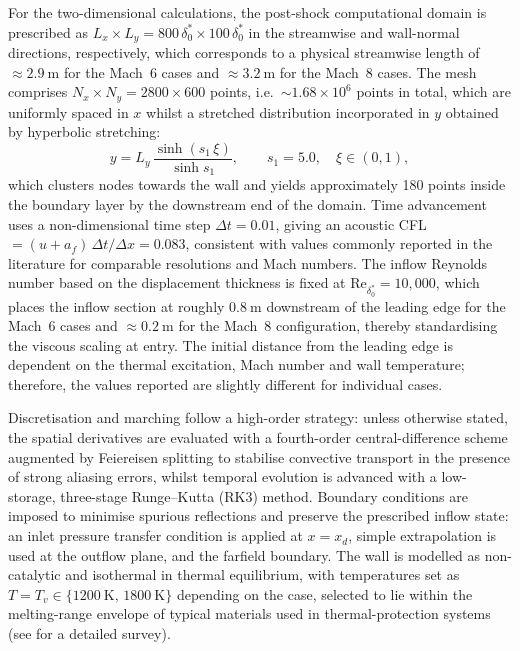 For the two-dimensional calculations, the post-shock computational domain is prescribed as $L_x\times L_y=800\,\delta^{*}_{0}\times 100\,\delta^{*}_{0}$ in the streamwise and wall-normal directions, respectively, which corresponds to a physical streamwise length of $\approx 2.9~\mathrm{m}$ for the Mach~6 cases and $\approx 3.2~\mathrm{m}$ for the Mach~8 cases. The mesh comprises $N_x\times N_y=2800\times 600$ points, i.e.\ $\sim 1.68\times 10^{6}$ points in total, which are uniformly spaced in $x$ whilst a stretched distribution incorporated in $y$ obtained by hyperbolic stretching:
\begin{equation}
y=L_y\,\frac{\sinh\!\left(s_1\,\xi\right)}{\sinh s_1},\qquad s_1=5.0,\quad \xi\in(0,1),
\end{equation}
which clusters nodes towards the wall and yields approximately 180 points inside the boundary layer by the downstream end of the domain. Time advancement uses a non-dimensional time step $\Delta t=0.01$, giving an acoustic \gls{CFL}$=(u+a_f)\,\Delta t/\Delta x=0.083$, consistent with values commonly reported in the literature for comparable resolutions and Mach numbers. The inflow Reynolds number based on the displacement thickness is fixed at $\mathrm{Re}_{\delta^{*}_0}=10{,}000$, which places the inflow section at roughly $ 0.8~\mathrm{m}$ downstream of the leading edge for the Mach~6 cases and $\approx 0.2~\mathrm{m}$ for the Mach~8 configuration, thereby standardising the viscous scaling at entry. The initial distance from the leading edge is dependent on the thermal excitation, Mach number and wall temperature; therefore, the values reported are slightly different for individual cases.

Discretisation and marching follow a high-order strategy: unless otherwise stated, the spatial derivatives are evaluated with a fourth-order central-difference scheme augmented by Feiereisen splitting to stabilise convective transport in the presence of strong aliasing errors, whilst temporal evolution is advanced with a low-storage, three-stage Runge--Kutta (RK3) method. Boundary conditions are imposed to minimise spurious reflections and preserve the prescribed inflow state: an inlet pressure transfer condition is applied at $x=x_d$, simple extrapolation is used at the outflow plane, and the farfield boundary. The wall is modelled as non-catalytic and isothermal in thermal equilibrium, with temperatures set as $T=T_v\in\{1200~\mathrm{K},\,1800~\mathrm{K}\}$ depending on the case, selected to lie within the melting-range envelope of typical materials used in thermal-protection systems (see \cite{CedillosBarraza2016} for a detailed survey).

